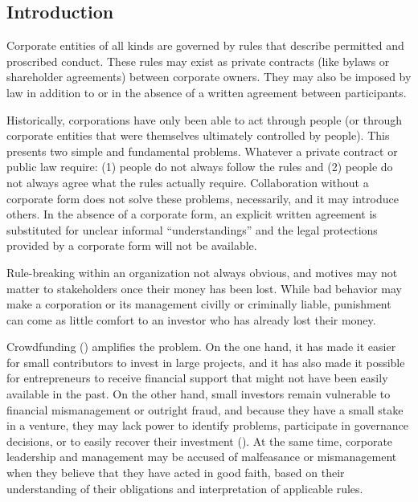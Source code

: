\documentclass[9pt,oneside]{amsart}
\begin{document}
\setlength{\columnsep}{20pt}
\begin{multicols}{2}

\section{Introduction}\label{sec:introduction}

Corporate entities of all kinds are governed by rules that describe permitted and proscribed conduct. These rules may exist as private contracts (like bylaws or shareholder agreements) between corporate owners. They may also be imposed by law in addition to or in the absence of a written agreement between participants.

Historically, corporations have only been able to act through people (or through corporate entities that were themselves ultimately controlled by people). This presents two simple and fundamental problems. Whatever a private contract or public law require:  (1) people do not always follow the rules and (2) people do not always agree what the rules actually require. Collaboration without a corporate form does not solve these problems, necessarily, and it may introduce others. In the absence of a corporate form, an explicit written agreement is substituted for unclear informal ``understandings'' and the legal protections provided by a corporate form will not be available.

Rule-breaking within an organization not always obvious, and motives may not matter to stakeholders once their money has been lost. While bad behavior may make a corporation or its management civilly or criminally liable, punishment can come as little comfort to an investor who has already lost their money.  

Crowdfunding (\cite{2015CFReport}) amplifies the problem. On the one hand, it has made it easier for small contributors to invest in large projects, and it has also made it possible for entrepreneurs to receive financial support that might not have been easily available in the past. On the other hand, small investors remain vulnerable to financial mismanagement or outright fraud, and because they have a small stake in a venture, they may lack power to identify problems, participate in governance decisions, or to easily recover their investment (\cite{9MostDisgracefulCrowdFundings, CrowdfundingFailTC}). At the same time, corporate leadership and management may be accused of malfeasance or mismanagement when they believe that they have acted in good faith, based on their understanding of their obligations and interpretation of applicable rules.


\end{multicols}
\end{document}
